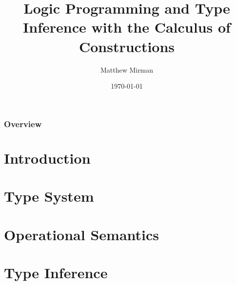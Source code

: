 \documentclass[hyperref={pdfpagelabels=false}]{beamer}
\title[Caledon]{Logic Programming and Type Inference with the Calculus of Constructions } %
\author{Matthew Mirman} %
\institute[CMU SCS] %
{
School of Computer Science, Carnegie Mellon University \\
\medskip
\textit{mmirman@andrew.cmu.edu} \\
\medskip
\textbf{Advisor:} Frank Pfenning \textit{fp@cs.cmu.edu}
}
\date{\today} %
\begin{document}
\begin{frame}
\titlepage %
\end{frame}

\begin{frame}
\frametitle{Overview} %
\tableofcontents %
\end{frame}


\section{Introduction}
    
%    
     
\section{Type System}
%    
%     
%    
%    
  
\section{Operational Semantics}
%    
%    
%    
%    
%    
%    
          
\section{Type Inference} 
%    
%     
%    
%    
             
\end{document}
